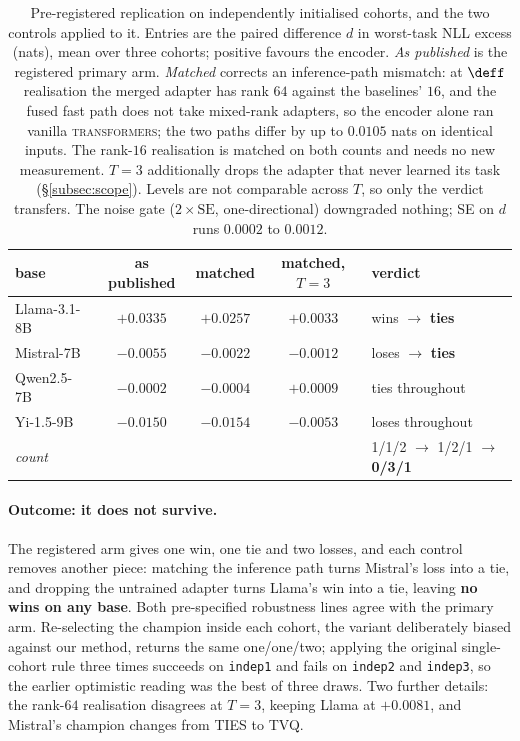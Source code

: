 \begin{table}[t]
\centering
\small
\caption{Pre-registered replication on independently initialised cohorts,
and the two controls applied to it. Entries are the paired difference $d$
in worst-task NLL excess (nats), mean over three cohorts; positive favours
the encoder. \emph{As published} is the registered primary arm.
\emph{Matched} corrects an inference-path mismatch: at $\deff$ realisation
the merged adapter has rank $64$ against the baselines' $16$, and the fused
fast path does not take mixed-rank adapters, so the encoder alone ran
vanilla \textsc{transformers}; the two paths differ by up to $0.0105$ nats
on identical inputs. The rank-$16$ realisation is matched on both counts
and needs no new measurement. $T = 3$ additionally drops the adapter that
never learned its task (\S\ref{subsec:scope}). Levels are not comparable
across $T$, so only the verdict transfers. The noise gate
($2\times\mathrm{SE}$, one-directional) downgraded nothing; SE on $d$ runs
$0.0002$ to $0.0012$.}
\label{tab:q1}
\begin{tabular}{lcccl}
\toprule
base & as published & matched & matched, $T=3$ & verdict \\
\midrule
Llama-3.1-8B & $+0.0335$ & $+0.0257$ & $+0.0033$ & wins $\to$ \textbf{ties} \\
Mistral-7B   & $-0.0055$ & $-0.0022$ & $-0.0012$ & loses $\to$ \textbf{ties} \\
Qwen2.5-7B   & $-0.0002$ & $-0.0004$ & $+0.0009$ & ties throughout \\
Yi-1.5-9B    & $-0.0150$ & $-0.0154$ & $-0.0053$ & loses throughout \\
\midrule
\multicolumn{4}{l}{\emph{count}} & 1/1/2 $\to$ 1/2/1 $\to$ \textbf{0/3/1} \\
\bottomrule
\end{tabular}
\end{table}

\paragraph{Outcome: it does not survive.} The registered arm gives one win,
one tie and two losses, and each control removes another piece: matching
the inference path turns Mistral's loss into a tie, and dropping the
untrained adapter turns Llama's win into a tie, leaving \textbf{no wins on
any base}. Both pre-specified robustness lines agree with the primary arm.
Re-selecting the champion inside each cohort, the variant deliberately
biased against our method, returns the same one/one/two; applying the
original single-cohort rule three times succeeds on \texttt{indep1} and
fails on \texttt{indep2} and \texttt{indep3}, so the earlier optimistic
reading was the best of three draws. Two further details: the rank-$64$ realisation disagrees at $T=3$, keeping Llama at
$+0.0081$, and Mistral's champion changes from TIES to TVQ.

